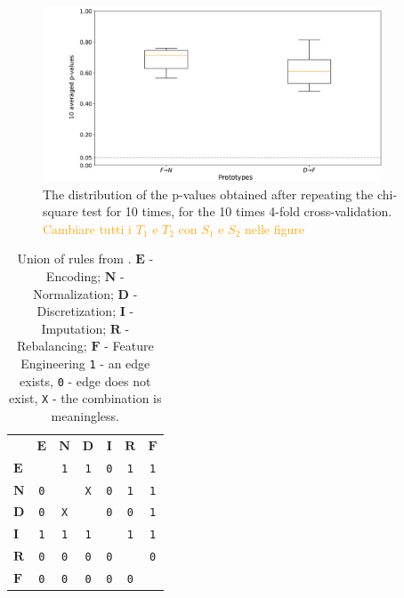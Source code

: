 \begin{figure}[!t]
	\centering
	\includegraphics[width=0.9\textwidth]{chapters/data-centric/supervised/img/10_times_4_folds_cv.pdf}
	\caption{The distribution of the p-values obtained after repeating the chi-square test for 10 times, for the 10 times 4-fold cross-validation. \textcolor{orange}{Cambiare tutti i $T_1$ e $T_2$ con $S_1$ e $S_2$ nelle figure}}
	\label{effective-fig:10-times-4-cv}
\end{figure}

\begin{table}[b]
	\caption{
		Union of rules from . $\boldsymbol{E}$ - Encoding; $\boldsymbol{N}$ - Normalization; $\boldsymbol{D}$ - Discretization; $\boldsymbol{I}$ - Imputation; $\boldsymbol{R}$ - Rebalancing; $\boldsymbol{F}$ - Feature Engineering \texttt{1} - an edge exists, \texttt{0} - edge does not exist, \texttt{X} - the combination is meaningless.
	}
	\renewcommand{\arraystretch}{0.3}
	\footnotesize
	\centering
	\label{effective-tbl:rules-union}
	\begin{threeparttable}
		\begin{tabular}{@{}lcccccc}
			\toprule
			& $\boldsymbol{E}$ & $\boldsymbol{N}$ & $\boldsymbol{D}$ & $\boldsymbol{I}$ & $\boldsymbol{R}$ & $\boldsymbol{F}$
			\\	\cmidrule[.1em]{1-7}
			$\boldsymbol{E}$ & \cellcolor{gray!25} & \texttt{1} & \texttt{1} & \texttt{0} & \texttt{1} & \texttt{1} \\	\cmidrule[.1em]{1-7}
			$\boldsymbol{N}$ & \texttt{0} & \cellcolor{gray!25}  & \texttt{X} & \texttt{0} & \texttt{1} & \texttt{1} \\	\cmidrule[.1em]{1-7}
			$\boldsymbol{D}$ & \texttt{0} & \texttt{X} & \cellcolor{gray!25} & \texttt{0} & \texttt{0} & \texttt{1} \\	\cmidrule[.1em]{1-7}
			$\boldsymbol{I}$ & \texttt{1} & \texttt{1} & \texttt{1} & \cellcolor{gray!25}  & \texttt{1} & \texttt{1} \\	\cmidrule[.1em]{1-7}
			$\boldsymbol{R}$ & \texttt{0} & \texttt{0} & \texttt{0} & \texttt{0} & \cellcolor{gray!25}  & \texttt{0} \\	\cmidrule[.1em]{1-7}
			$\boldsymbol{F}$ & \texttt{0} & \texttt{0} & \texttt{0} & \texttt{0} & \texttt{0} & \cellcolor{gray!25} \\	\cmidrule[.1em]{1-7}
		\end{tabular}
	\end{threeparttable}
\end{table}

